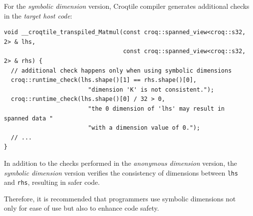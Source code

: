 For the \emph{symbolic dimension} version, Croqtile compiler generates additional checks in the \emph{target host code}:

\begin{lstlisting}[language={},caption={The generated shape check}]
void __croqtile_transpiled_Matmul(const croq::spanned_view<croq::s32, 2> & lhs,
                                  const croq::spanned_view<croq::s32, 2> & rhs) {
  // additional check happens only when using symbolic dimensions
  croq::runtime_check(lhs.shape()[1] == rhs.shape()[0],
                        "dimension 'K' is not consistent.");
  croq::runtime_check(lhs.shape()[0] / 32 > 0,
                        "the 0 dimension of 'lhs' may result in spanned data "
                        "with a dimension value of 0.");
  // ...
}
\end{lstlisting}

In addition to the checks performed in the \emph{anonymous dimension} version, the \emph{symbolic dimension} version verifies the consistency of dimensions between \texttt{lhs} and \texttt{rhs}, resulting in safer code.

Therefore, it is recommended that programmers use symbolic dimensions not only for ease of use but also to enhance code safety.
